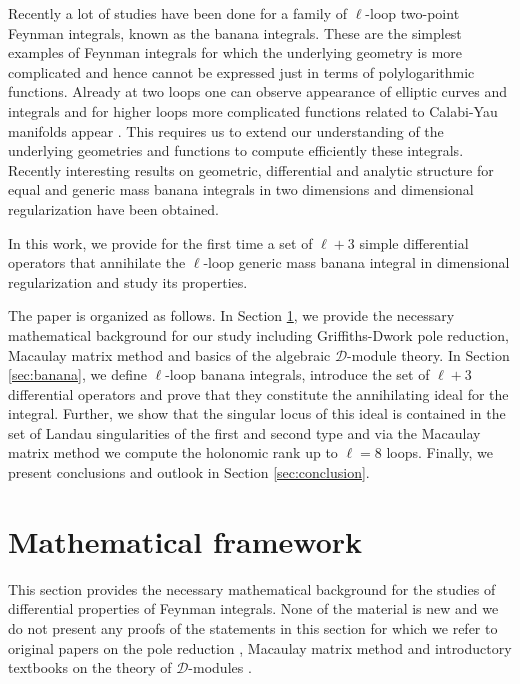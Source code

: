 \documentclass[11pt]{article}
\begin{document}
Recently a lot of studies have been done for a family of $\ell$-loop two-point Feynman integrals, known as the banana integrals. These are the simplest examples of Feynman integrals for which the underlying geometry is more complicated and hence cannot be expressed just in terms of polylogarithmic functions. Already at two loops one can observe appearance of elliptic curves and integrals \cite{Sabry:1962rge,Broadhurst:1993mw,Laporta:2004rb,Bloch:2013tra,Adams:2015ydq,Adams:2017ejb,Broedel:2017siw,Adams:2018yfj,Honemann:2018mrb,Bogner:2017vim,Weinzierl:2020fyx,Remiddi:2016gno,Berends:1993ee,Caffo:1998du,Muller-Stach:2011qkg,Adams:2013nia,Remiddi:2013joa,Campert:2020yur,Bogner:2019lfa,Bloch:2016izu,Adams:2015gva,Adams:2014vja,Giroux:2022wav,Cacciatori:2023tzp} and for higher loops more complicated functions related to Calabi-Yau manifolds appear \cite{Broedel:2021zij,Pogel:2022yat,Pogel:2022ken,Duhr:2024bzt,Duhr:2025tdf,Duhr:2025kkq,Pogel:2025bca}. This requires us to extend our understanding of the underlying geometries and functions to compute efficiently these integrals. 
Recently interesting results on geometric, differential and analytic structure for equal and generic mass banana integrals in two dimensions \cite{Vanhove:2014wqa,Klemm:2019dbm,Bonisch:2020qmm} and dimensional regularization \cite{Bonisch:2021yfw} have been obtained.

In this work, we provide for the first time a set of $\ell+3$ simple differential operators that annihilate the $\ell$-loop generic mass banana integral in dimensional regularization and study its properties.  

The paper is organized as follows. In Section \ref{sec:math}, we provide the necessary mathematical background for our study including Griffiths-Dwork pole reduction, Macaulay matrix method and basics of the algebraic $\mathcal{D}$-module theory. In Section \ref{sec:banana}, we define $\ell$-loop banana integrals, introduce the set of $\ell+3$ differential operators and prove that they constitute the annihilating ideal for the integral. Further, we show that the singular locus of this ideal is contained in the set of Landau singularities of the first and second type and via the Macaulay matrix method we compute the holonomic rank up to $\ell = 8$ loops. Finally, we present conclusions and outlook in Section \ref{sec:conclusion}.


%
%
%
\section{Mathematical framework}\label{sec:math}
This section provides the necessary mathematical background for the studies of differential properties of Feynman integrals. None of the material is new and we do not present any proofs of the statements in this section for which we refer to original papers on the pole reduction \cite{Griffiths_1969,Dwork1962,Dwork1964}, Macaulay matrix method \cite{Chestnov:2022alh} and introductory textbooks on the theory of $\mathcal{D}$-modules \cite{coutinho1995primer,saito2000gröbner,hibi2014gröbner}.  
\end{document}
